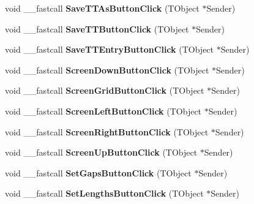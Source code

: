 \begin{DoxyCompactItemize}
\mbox{\label{class_t_interface_a5303472f28bc4bb52b74e48d5bbac665}} 
void \+\_\+\+\_\+fastcall {\bfseries Save\+T\+T\+As\+Button\+Click} (T\+Object $\ast$Sender)
\item 
\mbox{\label{class_t_interface_aa1135726a1c64c7b9b5436c81f1f7e97}} 
void \+\_\+\+\_\+fastcall {\bfseries Save\+T\+T\+Button\+Click} (T\+Object $\ast$Sender)
\item 
\mbox{\label{class_t_interface_a3cf355e15ec89570b79bd893ffbf0818}} 
void \+\_\+\+\_\+fastcall {\bfseries Save\+T\+T\+Entry\+Button\+Click} (T\+Object $\ast$Sender)
\item 
\mbox{\label{class_t_interface_ad53c136eca39fddb0e7e49a4b7018f66}} 
void \+\_\+\+\_\+fastcall {\bfseries Screen\+Down\+Button\+Click} (T\+Object $\ast$Sender)
\item 
\mbox{\label{class_t_interface_a05d882d712519bd79267e4ce5a52269c}} 
void \+\_\+\+\_\+fastcall {\bfseries Screen\+Grid\+Button\+Click} (T\+Object $\ast$Sender)
\item 
\mbox{\label{class_t_interface_a358ab18cab57f8a5b5b850387039f822}} 
void \+\_\+\+\_\+fastcall {\bfseries Screen\+Left\+Button\+Click} (T\+Object $\ast$Sender)
\item 
\mbox{\label{class_t_interface_aba3f772739d000bcbd8059181417a9b3}} 
void \+\_\+\+\_\+fastcall {\bfseries Screen\+Right\+Button\+Click} (T\+Object $\ast$Sender)
\item 
\mbox{\label{class_t_interface_a714f1498bb6cbbd706f6ed0882c4b03d}} 
void \+\_\+\+\_\+fastcall {\bfseries Screen\+Up\+Button\+Click} (T\+Object $\ast$Sender)
\item 
\mbox{\label{class_t_interface_a19148984e07e16178b6a6898bcbcdf22}} 
void \+\_\+\+\_\+fastcall {\bfseries Set\+Gaps\+Button\+Click} (T\+Object $\ast$Sender)
\item 
\mbox{\label{class_t_interface_a4b0c482229c19b856a8c3f07815e5d7d}} 
void \+\_\+\+\_\+fastcall {\bfseries Set\+Lengths\+Button\+Click} (T\+Object $\ast$Sender)

\end{DoxyCompactItemize}
